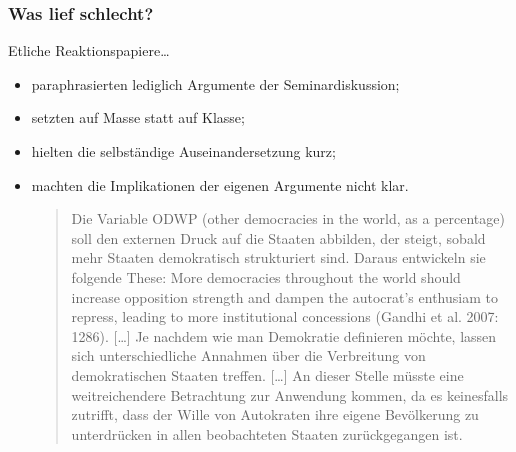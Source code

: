 \documentclass{beamer}
\begin{document}
\begin{frame}
  \frametitle{Was lief schlecht?}
  Etliche Reaktionspapiere\dots
  \begin{itemize}
    \item paraphrasierten lediglich Argumente der Seminardiskussion;
    \item setzten auf Masse statt auf Klasse;
    \item hielten die selbständige Auseinandersetzung kurz;
    \item machten die Implikationen der eigenen Argumente nicht klar.\newline
    \begin{quote}
      \scriptsize
      Die Variable ODWP (other democracies in the world, as a
      percentage) soll den externen Druck auf die Staaten
      abbilden, der steigt, sobald mehr Staaten demokratisch
      strukturiert sind. Daraus entwickeln sie folgende These:
      {\glqq}More democracies throughout the world should
      increase opposition strength and dampen the autocrat’s
      enthusiam to repress, leading to more institutional
      concessions (Gandhi et al. 2007: 1286).{\grqq} [\dots] Je nachdem wie man
      Demokratie definieren möchte, lassen sich
      unterschiedliche Annahmen über die Verbreitung von
      demokratischen Staaten treffen. [\dots] An dieser Stelle
      müsste eine weitreichendere Betrachtung zur Anwendung
      kommen, da es keinesfalls zutrifft, dass der Wille von
      Autokraten ihre eigene Bevölkerung zu unterdrücken in
      allen beobachteten Staaten zurückgegangen ist.
    \end{quote}
  \end{itemize}
\end{frame}
\end{document}
